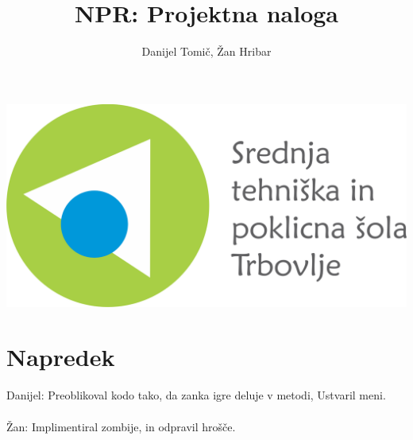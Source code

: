 \documentclass[a4paper]{article}
\author{Danijel Tomič, Žan Hribar}
\title{NPR: Projektna naloga}
\begin{document}
\maketitle

\begin{center}
\includegraphics[scale=0.5]{Logotip-z-napisom.png}
\end{center}
\newpage


\section{Napredek}

Danijel: Preoblikoval kodo tako, da zanka igre deluje v metodi, Ustvaril meni.
\\
\\
Žan: Implimentiral zombije, in odpravil hrošče.
\end{document}
